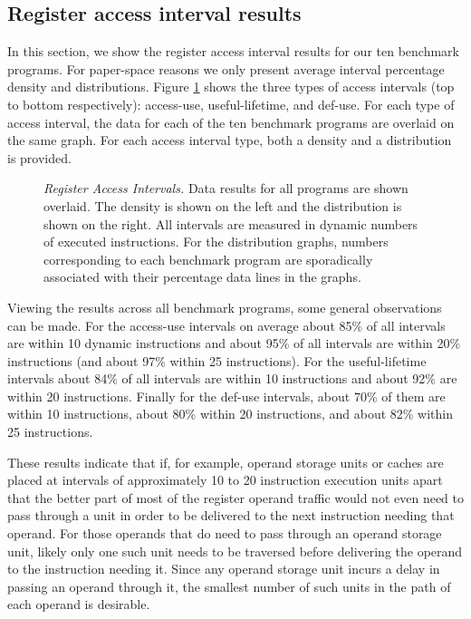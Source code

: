 \documentclass[10pt,dvips]{article}
\begin{document}
\subsection{Register access interval results}
%
In this section, we show the register access interval results for
our ten benchmark programs.
For paper-space reasons we only present average interval percentage
density and distributions.
%
Figure \ref{fig:a_rover} shows
the three types of access intervals (top to bottom respectively):
access-use, useful-lifetime, and def-use.
For each type of access interval, the data for each of the
ten benchmark programs are overlaid on the same graph.
For each access interval type, both a density 
and a distribution is provided.
%
%
\begin{figure}[htb]
\centering
{}
\caption{{\em Register Access Intervals.} 
\small{
Data results for all programs are shown overlaid.
The density is shown on the left and the distribution is shown
on the right.
All intervals are measured in dynamic numbers of executed instructions.
For the distribution graphs, numbers corresponding to each
benchmark program are sporadically associated with their
percentage data lines in the graphs.
}
}
\label{fig:a_rover}
\end{figure}
%
%
%
Viewing the results across all benchmark programs, some
general observations can be made.
For the access-use intervals
on average about 85\% of all intervals are within
10 dynamic instructions and about 95\% of all intervals
are within 20\% instructions (and about 97\% within 25 instructions).
For the useful-lifetime intervals about 84\% of all
intervals are within 10 instructions and about 92\% are within
20 instructions.
Finally for the def-use intervals, about 70\% of them
are within 10 instructions, about 80\% within 20 instructions,
and about 82\% within 25 instructions.

These results indicate that if, for example,
operand storage units or caches are placed at intervals of
approximately 10 to 20 instruction execution units apart that
the better part of most of the register operand traffic
would not even need to pass through a unit in order to be
delivered to the next instruction needing that operand.
For those operands that do need to pass through an operand
storage unit, likely only one such unit needs to be traversed before
delivering the operand to the instruction needing it.
Since any operand storage unit incurs a delay in passing
an operand through it, the smallest number of such units
in the path of each operand is desirable.
%
%
\end{document}
